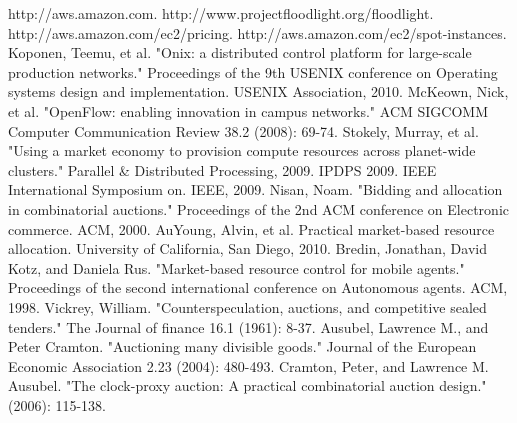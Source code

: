 \documentclass[a4paper,11pt,twocolumn]{article}
\begin{document}
\begin{thebibliography}{99}
  http://aws.amazon.com.
  http://www.projectfloodlight.org/floodlight.
  http://aws.amazon.com/ec2/pricing.
  http://aws.amazon.com/ec2/spot-instances.
  Koponen, Teemu, et al. "Onix: a distributed control platform for large-scale production networks." Proceedings of the 9th USENIX conference on Operating systems design and implementation. USENIX Association, 2010.
  McKeown, Nick, et al. "OpenFlow: enabling innovation in campus networks." ACM SIGCOMM Computer Communication Review 38.2 (2008): 69-74.
  Stokely, Murray, et al. "Using a market economy to provision compute resources across planet-wide clusters." Parallel \& Distributed Processing, 2009. IPDPS 2009. IEEE International Symposium on. IEEE, 2009.
  Nisan, Noam. "Bidding and allocation in combinatorial auctions." Proceedings of the 2nd ACM conference on Electronic commerce. ACM, 2000.
  AuYoung, Alvin, et al. Practical market-based resource allocation. University of California, San Diego, 2010.
  Bredin, Jonathan, David Kotz, and Daniela Rus. "Market-based resource control for mobile agents." Proceedings of the second international conference on Autonomous agents. ACM, 1998.
  Vickrey, William. "Counterspeculation, auctions, and competitive sealed tenders." The Journal of finance 16.1 (1961): 8-37.
  Ausubel, Lawrence M., and Peter Cramton. "Auctioning many divisible goods." Journal of the European Economic Association 2.23 (2004): 480-493.
  Cramton, Peter, and Lawrence M. Ausubel. "The clock-proxy auction: A practical combinatorial auction design." (2006): 115-138.
 
\end{thebibliography}
\end{document}
